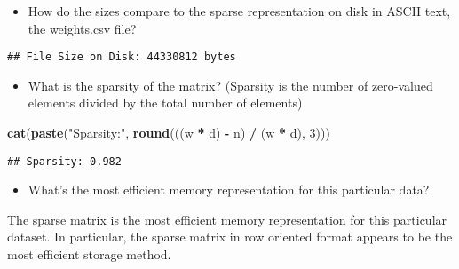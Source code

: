 \documentclass[]{article}
\newenvironment{Shaded}{\begin{snugshade}}{\end{snugshade}}
\newcommand{\DecValTok}[1]{\textcolor[rgb]{0.00,0.00,0.81}{#1}}
\newcommand{\KeywordTok}[1]{\textcolor[rgb]{0.13,0.29,0.53}{\textbf{#1}}}
\newcommand{\NormalTok}[1]{#1}
\newcommand{\OperatorTok}[1]{\textcolor[rgb]{0.81,0.36,0.00}{\textbf{#1}}}
\newcommand{\StringTok}[1]{\textcolor[rgb]{0.31,0.60,0.02}{#1}}
\providecommand{\tightlist}{%
  \setlength{\itemsep}{0pt}\setlength{\parskip}{0pt}}
\begin{document}
\begin{itemize}
\tightlist
\item
  How do the sizes compare to the sparse representation on disk in ASCII
  text, the weights.csv file?
\end{itemize}

\begin{Shaded}
\end{Shaded}

\begin{verbatim}
## File Size on Disk: 44330812 bytes
\end{verbatim}

\begin{itemize}
\tightlist
\item
  What is the sparsity of the matrix? (Sparsity is the number of
  zero-valued elements divided by the total number of elements)
\end{itemize}

\begin{Shaded}
\begin{Highlighting}[]
\KeywordTok{cat}\NormalTok{(}\KeywordTok{paste}\NormalTok{(}\StringTok{"Sparsity:"}\NormalTok{, }\KeywordTok{round}\NormalTok{(((w }\OperatorTok{*}\StringTok{ }\NormalTok{d) }\OperatorTok{-}\StringTok{ }\NormalTok{n) }\OperatorTok{/}\StringTok{ }\NormalTok{(w }\OperatorTok{*}\StringTok{ }\NormalTok{d), }\DecValTok{3}\NormalTok{)))}
\end{Highlighting}
\end{Shaded}

\begin{verbatim}
## Sparsity: 0.982
\end{verbatim}

\begin{itemize}
\tightlist
\item
  What's the most efficient memory representation for this particular
  data?
\end{itemize}

The sparse matrix is the most efficient memory representation for this
particular dataset. In particular, the sparse matrix in row oriented
format appears to be the most efficient storage method.
\end{document}
